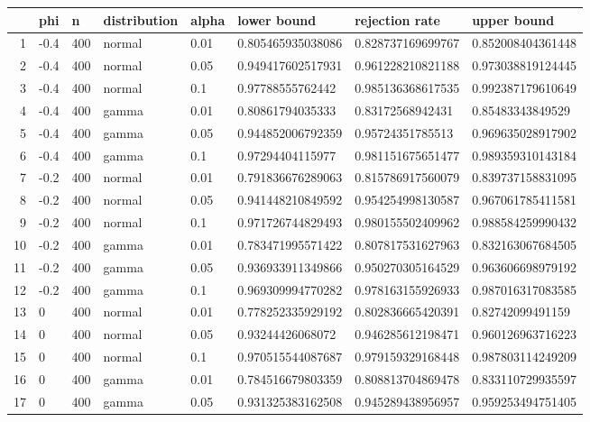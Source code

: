 \begin{table}[ht]
\centering
\begin{tabular}{rlllllll}
  \hline
 & phi & n & distribution & alpha & lower bound & rejection rate & upper bound \\ 
  \hline
1 & -0.4 & 400 & normal & 0.01 & 0.805465935038086 & 0.828737169699767 & 0.852008404361448 \\ 
  2 & -0.4 & 400 & normal & 0.05 & 0.949417602517931 & 0.961228210821188 & 0.973038819124445 \\ 
  3 & -0.4 & 400 & normal & 0.1 & 0.97788555762442 & 0.985136368617535 & 0.992387179610649 \\ 
  4 & -0.4 & 400 & gamma & 0.01 & 0.80861794035333 & 0.83172568942431 & 0.85483343849529 \\ 
  5 & -0.4 & 400 & gamma & 0.05 & 0.944852006792359 & 0.95724351785513 & 0.969635028917902 \\ 
  6 & -0.4 & 400 & gamma & 0.1 & 0.97294404115977 & 0.981151675651477 & 0.989359310143184 \\ 
  7 & -0.2 & 400 & normal & 0.01 & 0.791836676289063 & 0.815786917560079 & 0.839737158831095 \\ 
  8 & -0.2 & 400 & normal & 0.05 & 0.941448210849592 & 0.954254998130587 & 0.967061785411581 \\ 
  9 & -0.2 & 400 & normal & 0.1 & 0.971726744829493 & 0.980155502409962 & 0.988584259990432 \\ 
  10 & -0.2 & 400 & gamma & 0.01 & 0.783471995571422 & 0.807817531627963 & 0.832163067684505 \\ 
  11 & -0.2 & 400 & gamma & 0.05 & 0.936933911349866 & 0.950270305164529 & 0.963606698979192 \\ 
  12 & -0.2 & 400 & gamma & 0.1 & 0.969309994770282 & 0.978163155926933 & 0.987016317083585 \\ 
  13 & 0 & 400 & normal & 0.01 & 0.778252335929192 & 0.802836665420391 & 0.82742099491159 \\ 
  14 & 0 & 400 & normal & 0.05 & 0.93244426068072 & 0.946285612198471 & 0.960126963716223 \\ 
  15 & 0 & 400 & normal & 0.1 & 0.970515544087687 & 0.979159329168448 & 0.987803114249209 \\ 
  16 & 0 & 400 & gamma & 0.01 & 0.784516679803359 & 0.808813704869478 & 0.833110729935597 \\ 
  17 & 0 & 400 & gamma & 0.05 & 0.931325383162508 & 0.945289438956957 & 0.959253494751405 \\ 

\end{tabular}
\end{table}
